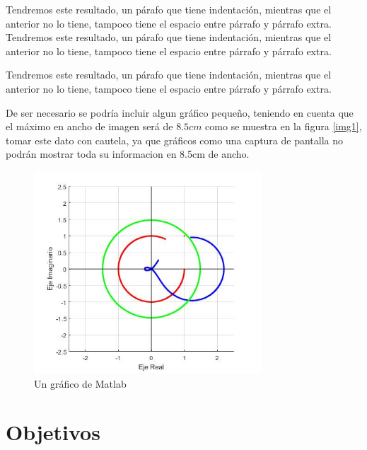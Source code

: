 \documentclass[a4paper]{IEEEtran} %
\begin{document}
Tendremos este resultado, un párafo que tiene indentación, mientras que el anterior no lo tiene, tampoco tiene el espacio entre párrafo y párrafo extra.
Tendremos este resultado, un párafo que tiene indentación, mientras que el anterior no lo tiene, tampoco tiene el espacio entre párrafo y párrafo extra.

Tendremos este resultado, un párafo que tiene indentación, mientras que el anterior no lo tiene, tampoco tiene el espacio entre párrafo y párrafo extra.

De ser necesario se podría incluir algun gráfico pequeño, teniendo en cuenta que el máximo en ancho de imagen será de $8.5cm$ como se muestra en la figura \eqref{img1}, tomar este dato con cautela, ya que gráficos como una captura de pantalla no podrán mostrar toda su informacion en 8.5cm de ancho.

\begin{figure} %
    \centering %
        \includegraphics[width=8.5cm]{imagenes/img1} %
        \caption{Un gráfico de Matlab} %
        \label{img1} %
\end{figure} %


\section{Objetivos}
\end{document}
